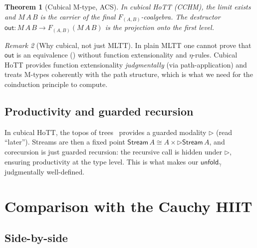\documentclass[12pt]{article}
\newtheorem{theorem}{Theorem}[section]
\theoremstyle{definition}
\theoremstyle{remark}
\newtheorem{remark}[theorem]{Remark}
\newcommand{\Stream}{\mathsf{Stream}}
\newcommand{\out}{\mathsf{out}}
\newcommand{\unfold}{\mathsf{unfold}}
\begin{document}
\begin{theorem}[Cubical M-type, ACS]\label{thm:cubicalM}
In cubical HoTT (CCHM), the limit  exists and
$M\,A\,B$ is the carrier of the final $F_{(A,B)}$-coalgebra.
The destructor $\out: M\,A\,B \to F_{(A,B)}(M\,A\,B)$ is the
projection onto the first level.
\end{theorem}

\begin{remark}[Why cubical, not just MLTT]
In plain MLTT one cannot prove that $\out$ is an equivalence
() without function extensionality and
$\eta$-rules. Cubical HoTT provides function extensionality
\emph{judgmentally} (via path-application) and treats
M-types coherently with the path structure, which is what we
need for the coinduction principle to compute.
\end{remark}

\subsection{Productivity and guarded recursion}

In cubical HoTT, the topos of trees~\cite{birkedal} provides a
guarded modality $\rhd$ (read ``later''). Streams are then a fixed point
$\Stream\,A \cong A \times \rhd \Stream\,A$, and corecursion is
just guarded recursion: the recursive call is hidden under $\rhd$,
ensuring productivity at the type level. This is what makes our
$\unfold_\gamma$ judgmentally well-defined.

\section{Comparison with the Cauchy HIIT}\label{sec:cauchy-vs-coalg}

\subsection{Side-by-side}
\end{document}
